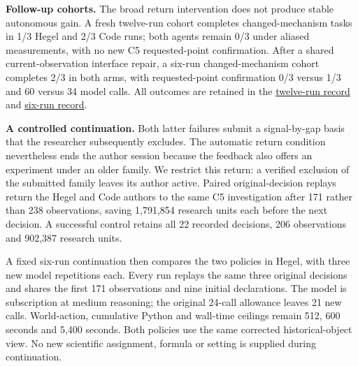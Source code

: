 \documentclass[twoside,11pt]{article}
\begin{document}
\textbf{Follow-up cohorts.} The broad return intervention does not produce stable autonomous gain. A fresh twelve-run cohort completes changed-mechanism tasks in 1/3 Hegel and 2/3 Code runs; both agents remain 0/3 under aliased measurements, with no new C5 requested-point confirmation. After a shared current-observation interface repair, a six-run changed-mechanism cohort completes 2/3 in both arms, with requested-point confirmation 0/3 versus 1/3 and 60 versus 34 model calls. All outcomes are retained in the \hyperlink{artifact-117}{twelve-run record} and \hyperlink{artifact-118}{six-run record}.


\textbf{A controlled continuation.} Both latter failures submit a signal-by-gap basis that the researcher subsequently excludes. The automatic return condition nevertheless ends the author session because the feedback also offers an experiment under an older family. We restrict this return: a verified exclusion of the submitted family leaves its author active. Paired original-decision replays return the Hegel and Code authors to the same C5 investigation after 171 rather than 238 observations, saving 1,791,854 research units each before the next decision. A successful control retains all 22 recorded decisions, 206 observations and 902,387 research units.


A fixed six-run continuation then compares the two policies in Hegel, with three new model repetitions each. Every run replays the same three original decisions and shares the first 171 observations and nine initial declarations. The model is subscription  at medium reasoning; the original 24-call allowance leaves 21 new calls. World-action, cumulative Python and wall-time ceilings remain 512, 600 seconds and 5,400 seconds. Both policies use the same corrected historical-object view. No new scientific assignment, formula or setting is supplied during continuation.
\end{document}
